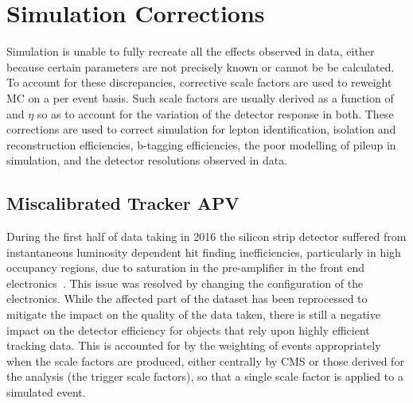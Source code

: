 \section{Simulation Corrections}\label{sec:simCorrections}
Simulation is unable to fully recreate all the effects observed in data, either because certain parameters are not precisely known or cannot be be calculated.
To account for these discrepancies, corrective scale factors are used to reweight MC on a per event basis.
Such scale factors are usually derived as a function of \pt and $\eta$ so as to account for the variation of the detector response in both.
These corrections are used to correct simulation for lepton identification, isolation and reconstruction efficiencies, b-tagging efficiencies, the poor modelling of pileup in simulation, and the detector resolutions observed in data.

\subsection{Miscalibrated Tracker APV}\label{subsec:hipEffect}
During the first half of data taking in 2016 the silicon strip detector suffered from instantaneous luminosity dependent  hit finding inefficiencies, particularly in high occupancy regions, due to saturation in the pre-amplifier in the front end electronics~\cite{Fiori:2016ebh}.
This issue was resolved by changing the configuration of the electronics.
While the affected part of the dataset has been reprocessed to mitigate the impact on the quality of the data taken, there is still a negative impact on the detector efficiency for objects that rely upon highly efficient tracking data.
This is accounted for by the weighting of events appropriately when the scale factors are produced, either centrally by CMS or those derived for the analysis (\ie the trigger scale factors), so that a single scale factor is applied to a simulated event.


